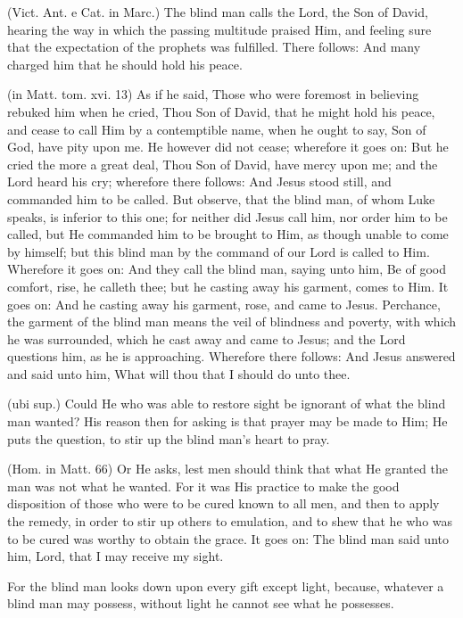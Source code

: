  (Vict. Ant. e Cat. in Marc.) The blind man calls the Lord, the Son of David, hearing the way in which the passing multitude praised Him, and feeling sure that the expectation of the prophets was fulfilled. There follows: And many charged him that he should hold his peace.

 (in Matt. tom. xvi. 13) As if he said, Those who were foremost in believing rebuked him when he cried, Thou Son of David, that he might hold his peace, and cease to call Him by a contemptible name, when he ought to say, Son of God, have pity upon me. He however did not cease; wherefore it goes on: But he cried the more a great deal, Thou Son of David, have mercy upon me; and the Lord heard his cry; wherefore there follows: And Jesus stood still, and commanded him to be called. But observe, that the blind man, of whom Luke speaks, is inferior to this one; for neither did Jesus call him, nor order him to be called, but He commanded him to be brought to Him, as though unable to come by himself; but this blind man by the command of our Lord is called to Him. Wherefore it goes on: And they call the blind man, saying unto him, Be of good comfort, rise, he calleth thee; but he casting away his garment, comes to Him. It goes on: And he casting away his garment, rose, and came to Jesus. Perchance, the garment of the blind man means the veil of blindness and poverty, with which he was surrounded, which he cast away and came to Jesus; and the Lord questions him, as he is approaching. Wherefore there follows: And Jesus answered and said unto him, What will thou that I should do unto thee.

 (ubi sup.) Could He who was able to restore sight be ignorant of what the blind man wanted? His reason then for asking is that prayer may be made to Him; He puts the question, to stir up the blind man’s heart to pray.

 (Hom. in Matt. 66) Or He asks, lest men should think that what He granted the man was not what he wanted. For it was His practice to make the good disposition of those who were to be cured known to all men, and then to apply the remedy, in order to stir up others to emulation, and to shew that he who was to be cured was worthy to obtain the grace. It goes on: The blind man said unto him, Lord, that I may receive my sight.

 For the blind man looks down upon every gift except light, because, whatever a blind man may possess, without light he cannot see what he possesses.


